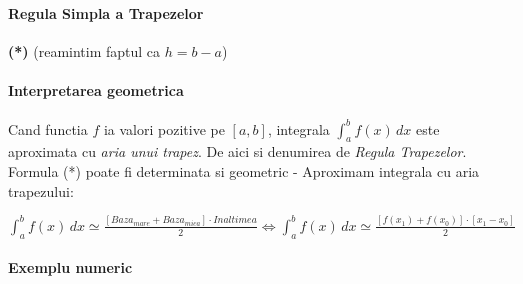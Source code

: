\documentclass{article}
\newenvironment{mdframe16cm}{%
    \begin{mdframed}[nobreak,userdefinedwidth=16cm]
}{%
    \end{mdframed}%
}%
\begin{document}
\begin{mdframe16cm}
    \vspace{-0.5cm}\paragraph{Regula Simpla a Trapezelor}
    \tabto{0.5cm} \textbf{(*)} (reamintim faptul ca $h=b-a$)
\end{mdframe16cm}

\paragraph{Interpretarea geometrica}

\tabto{0.5cm} Cand functia $f$ ia valori pozitive pe $[a,b]$, integrala $\int_a^b f(x)\, dx$ este aproximata cu \textit{aria unui trapez}. De aici si denumirea de \textit{Regula Trapezelor}. \\

Formula (*) poate fi determinata si geometric - Aproximam integrala cu aria trapezului:

$\int_a^b f(x)\, dx \simeq \frac{[Baza_{mare} + Baza_{mica}] \cdot Inaltimea}{2} \iff \int_a^b f(x)\, dx \simeq \frac{[f(x_1) + f(x_0)] \cdot [x_1 - x_0]}{2}$\\

\paragraph{Exemplu numeric}
\end{document}
